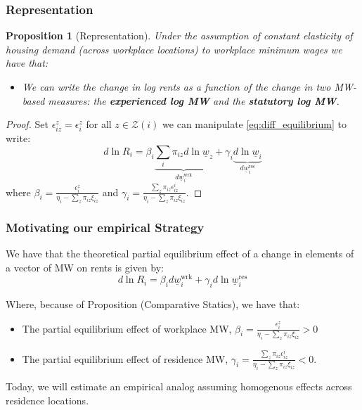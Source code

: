 \documentclass[aspectratio=169, t]{beamer}
\newtheorem{prop}{Proposition}
\newcommand{\Z}{\mathcal{Z}}
\newcommand{\MW}{\underline{w}}
\begin{document}
\begin{frame}[label = representation_prop]
    \frametitle{Representation}
    
	\begin{prop}[Representation]\label{prop:representation}
		Under the assumption of constant elasticity of housing demand (across workplace locations)
		to workplace minimum wages we have that:
		\begin{itemize}
			\item We can write the change in log rents as a function of the change in two 
			MW-based measures: the \textbf{experienced log MW} and the \textbf{statutory log MW}.
		\end{itemize}
	\end{prop}

	\pause
	\vspace{2mm}

	\begin{proof}
		Set $\epsilon_{iz}^z = \epsilon_i^z$ for all $z\in\Z(i)$ 
		we can manipulate \eqref{eq:diff_equilibrium} to write:
		\begin{equation} \label{eq:theory_represenation}
			d \ln R_i = \beta_i \underbrace{\sum_i \pi_{iz} d\ln \MW_z}_{d\MW^{\text{wrk}}_{i}} + \gamma_i \underbrace{d \ln \MW_i}_{d\MW^{\text{res}}_{i}}
		\end{equation}
		where $\beta_i = \frac{\epsilon_{i}^z}{\eta_{i} - \sum_z \pi_{iz} \xi_{iz}}$ 
		and $\gamma_i = \frac{\sum_z \pi_{iz} \epsilon_{iz}^i}{\eta_{i} 
				- \sum_z \pi_{iz} \xi_{iz}}$.
	\end{proof}
\end{frame}

\begin{frame}
	\frametitle{Motivating our empirical Strategy}
	We have that the theoretical partial equilibrium effect of a change in elements of a vector of MW on rents is given by:
		\begin{equation}
				d \ln R_i = \beta_i d \MW^{\text{wrk}}_{i}+ \gamma_i d \ln \MW^{\text{res}}_i
			\end{equation}
			
	Where, because of Proposition (Comparative Statics), we have that:
	\begin{itemize}
		\item The partial equilibrium effect of workplace MW, $\beta_i = \frac{\epsilon_{i}^z}{\eta_{i} - \sum_z \pi_{iz} \xi_{iz}} > 0$
		\item The partial equilibrium effect of residence MW, $\gamma_i = \frac{\sum_z \pi_{iz} \epsilon_{iz}^i}{\eta_{i} 
				- \sum_z \pi_{iz} \xi_{iz}} < 0$.
	\end{itemize}
			
	\pause

	\vspace{2mm}

	Today, we will estimate an empirical analog assuming homogenous effects across residence locations.

\end{frame}
\end{document}

